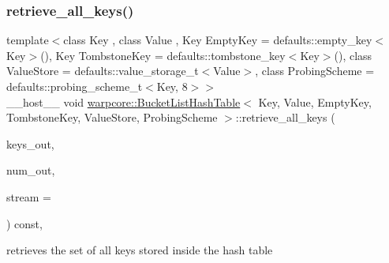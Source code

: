 \subsubsection{\texorpdfstring{retrieve\+\_\+all\+\_\+keys()}{retrieve\_all\_keys()}}
{\footnotesize\ttfamily template$<$class Key , class Value , Key Empty\+Key = defaults\+::empty\+\_\+key$<$\+Key$>$(), Key Tombstone\+Key = defaults\+::tombstone\+\_\+key$<$\+Key$>$(), class Value\+Store  = defaults\+::value\+\_\+storage\+\_\+t$<$\+Value$>$, class Probing\+Scheme  = defaults\+::probing\+\_\+scheme\+\_\+t$<$\+Key, 8$>$$>$ \\
\+\_\+\+\_\+host\+\_\+\+\_\+ void \hyperlink{classwarpcore_1_1BucketListHashTable}{warpcore\+::\+Bucket\+List\+Hash\+Table}$<$ Key, Value, Empty\+Key, Tombstone\+Key, Value\+Store, Probing\+Scheme $>$\+::retrieve\+\_\+all\+\_\+keys (\begin{DoxyParamCaption}\item[{key\+\_\+type $\ast$const}]{keys\+\_\+out,  }\item[{index\+\_\+type \&}]{num\+\_\+out,  }\item[{const cuda\+Stream\+\_\+t}]{stream = {} }\end{DoxyParamCaption}) const\hspace{0.3cm}{\ttfamily [inline]}, {\ttfamily [noexcept]}}



retrieves the set of all keys stored inside the hash table 


